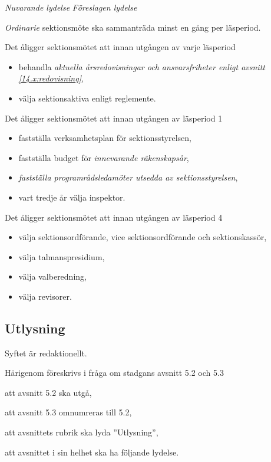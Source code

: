 \documentclass{article}
\newenvironment{lydelse}
    {\begin{paracol}{2}%
        \emph{Nuvarande lydelse}%
        \switchcolumn%
        \emph{Föreslagen lydelse}%
    \end{paracol}%
    \begin{enumerate}[label=\thesubsection.\arabic*]%
    \begin{paracol}{2}%
    }{\end{paracol}\end{enumerate}}
\begin{document}
\begin{lydelse}
  \switchcolumn
  \setcounter{subsection}{1}

  \item \emph{Ordinarie} sektionsmöte ska sammanträda minst en gång per läsperiod.

  \item Det åligger sektionsmötet att innan utgången av varje läsperiod
  \begin{itemize}
    \item behandla \emph{aktuella årsredovisningar och ansvarsfriheter enligt avsnitt \ref{14.x:redovisning}},
    \item välja sektionsaktiva enligt reglemente.
  \end{itemize}

  \item Det åligger sektionsmötet att innan utgången av läsperiod 1
  \begin{itemize}
    \item fastställa verksamhetsplan för sektionsstyrelsen,
    \item fastställa budget för \emph{innevarande räkenskapsår},
    \item \emph{fastställa programrådsledamöter utsedda av sektionsstyrelsen},
    \item vart tredje år välja inspektor.
  \end{itemize}

  \item Det åligger sektionsmötet att innan utgången av läsperiod 4
  \begin{itemize}
    \item välja sektionsordförande, vice sektionsordförande och sektionskassör,
    \item välja talmanspresidium,
    \item välja valberedning,
    \item välja revisorer.
  \end{itemize}
\end{lydelse}

\setcounter{subsection}{1}
\subsection{Utlysning} \label{5.2:utlysning}
Syftet är redaktionellt.

Härigenom föreskrivs i fråga om stadgans avsnitt 5.2 och 5.3
\begin{dels}
\item att avsnitt 5.2 ska utgå,
\item att avsnitt 5.3 omnumreras till 5.2,
\item att avsnittets rubrik ska lyda ''Utlysning'',
\item att avsnittet i sin helhet ska ha följande lydelse.
\end{dels}
\end{document}

